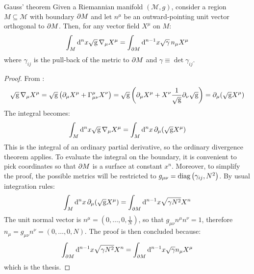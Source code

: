 \begin{theorem}{Gauss' theorem}{}
  Given a Riemannian manifold $ (\mathcal{M},g) $, consider a region $ M \subseteq \mathcal{M} $ with boundary $ \partial M $ and let $ n^\mu $ be an outward-pointing unit vector orthogonal to $ \partial M $. Then, for any vector field $ X^\mu $ on $ M $:
  \begin{equation}
    \int_M \mathrm{d}^n x \sqrt{\mathrm{g}}\, \nabla_\mu X^\mu = \int_{\partial M} \mathrm{d}^{n-1} x \sqrt{\gamma}\, n_\mu X^\mu
    \label{eq:gauss-theorem}
  \end{equation}
  where $ \gamma_{ij} $ is the pull-back of the metric to $ \partial M $ and $ \gamma \equiv \det \gamma_{ij} $.
\end{theorem}

\begin{proofbox}
  \begin{proof}
    From :
    \begin{equation*}
      \sqrt{\mathrm{g}}\, \nabla_\mu X^\mu = \sqrt{\mathrm{g}} \left( \partial_\mu X^\mu + \Gamma^\mu_{\mu \nu} X^\nu \right) = \sqrt{\mathrm{g}} \left( \partial_\mu X^\mu + X^\nu \frac{1}{\sqrt{\mathrm{g}}} \partial_\nu \sqrt{\mathrm{g}} \right) = \partial_\mu ( \sqrt{\mathrm{g}} X^\mu )
    \end{equation*}
    The integral becomes:
    \begin{equation*}
      \int_M \mathrm{d}^n x \sqrt{\mathrm{g}}\, \nabla_\mu X^\mu = \int_M \mathrm{d}^n x\, \partial_\mu (\sqrt{\mathrm{g}} X^\mu)
    \end{equation*}
    This is the integral of an ordinary partial derivative, so the ordinary divergence theorem applies. To evaluate the integral on the boundary, it is convenient to pick coordinates so that $ \partial M $ is a surface at constant $ x^n $. Moreover, to simplify the proof, the possible metrics will be restricted to $ g_{\mu \nu} = \operatorname{diag} \left( \gamma_{ij}, N^2 \right) $. By usual integration rules:
    \begin{equation*}
      \int_M \mathrm{d}^n x\, \partial_\mu ( \sqrt{\mathrm{g}} X^\mu) = \int_{\partial M} \mathrm{d}^{n-1} x \sqrt{\gamma N^2} X^n
    \end{equation*}
    The unit normal vector is $ n^\mu = (0,\dots,0,\frac{1}{N}) $, so that $ g_{\mu \nu} n^\mu n^\nu = 1 $, therefore $ n_\mu = g_{\mu \nu} n^\nu = (0,\dots,0,N) $. The proof is then concluded because:
    \begin{equation*}
      \int_{\partial M} \mathrm{d}^{n-1} x\sqrt{\gamma N^2} X^n = \int_{\partial M} \mathrm{d}^{n-1} x \sqrt{\gamma} n_\mu X^\mu
    \end{equation*}
    which is the thesis.
  \end{proof}
\end{proofbox}

